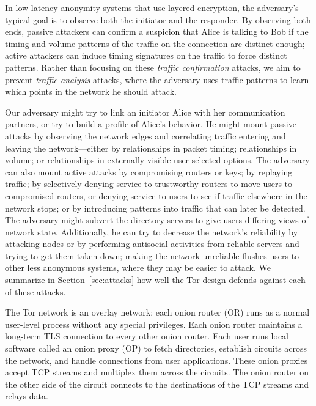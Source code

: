\documentclass[times,10pt,twocolumn]{article}
\begin{document}
In low-latency anonymity systems that use layered encryption, the
adversary's typical goal is to observe both the initiator and the
responder. By observing both ends, passive attackers can confirm a
suspicion that Alice is 
talking to Bob if the timing and volume patterns of the traffic on the
connection are distinct enough; active attackers can induce timing
signatures on the traffic to force distinct patterns. Rather
than focusing on these \emph{traffic confirmation} attacks,
we aim to prevent \emph{traffic
analysis} attacks, where the adversary uses traffic patterns to learn
which points in the network he should attack.

Our adversary might try to link an initiator Alice with her
communication partners, or try to build a profile of Alice's
behavior. He might mount passive attacks by observing the network edges
and correlating traffic entering and leaving the network---either
by relationships in packet timing; relationships in volume;
or relationships in externally visible user-selected
options. The adversary can also mount active attacks by compromising
routers or keys; by replaying traffic; by selectively denying service
to trustworthy routers to move users to
compromised routers, or denying service to users to see if traffic
elsewhere in the
network stops; or by introducing patterns into traffic that can later be
detected. The adversary might subvert the directory servers to give users
differing views of network state. Additionally, he can try to decrease
the network's reliability by attacking nodes or by performing antisocial
activities from reliable servers and trying to get them taken down;
making the network unreliable flushes users to other less anonymous
systems, where they may be easier to attack.
We summarize
in Section~\ref{sec:attacks} how well the Tor design defends against
each of these attacks.


\label{sec:design}

The Tor network is an overlay network; each onion router (OR) 
runs as a normal
user-level process without any special privileges.
Each onion router maintains a long-term TLS \cite{TLS}
connection to every other onion router.
Each user
runs local software called an onion proxy (OP) to fetch directories,
establish circuits across the network,
and handle connections from user applications.  These onion proxies accept
TCP streams and multiplex them across the circuits. The onion
router on the other side 
of the circuit connects to the destinations of
the TCP streams and relays data.
\end{document}
